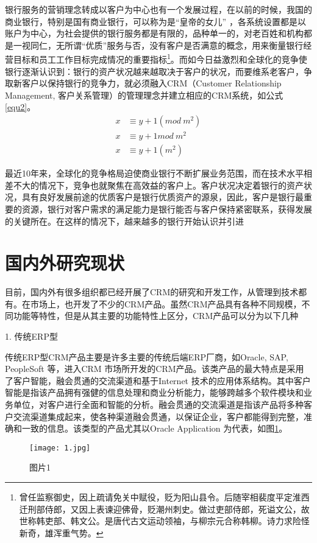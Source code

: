 银行服务的营销理念转成以客户为中心也有一个发展过程，在以前的时候，我国的商业银行，特别是国有商业银行，可以称为是“皇帝的女儿” ，各系统设置都是以账户为中心，为社会提供的银行服务都是有限的，品种单一的，对老百姓和机构都是一视同仁，无所谓“优质”服务与否，没有客户是否满意的概念，用来衡量银行经营目标和员工工作目标完成情况的重要指标\footnote{曾任监察御史，因上疏请免关中赋役，贬为阳山县令。后随宰相裴度平定淮西迁刑部侍郎，又因上表谏迎佛骨，贬潮州刺史。做过吏部侍郎，死谥文公，故世称韩吏部、韩文公。是唐代古文运动领袖，与柳宗元合称韩柳。诗力求险怪新奇，雄浑重气势。}。而如今日益激烈和全球化的竞争使银行逐渐认识到：银行的资产状况越来越取决于客户的状况，而要维系老客户，争取新客户以保持银行的竞争力，就必须融入CRM（Customer Relationship Management, 客户关系管理）的管理理念并建立相应的CRM系统，如公式\ref{equ2}。
\begin{align}\label{equ2}
  x&\equiv y+1(mod ~m^{2}) \\
  x&\equiv y+1mod ~m^{2} \nonumber \\
  x&\equiv y+1(m^{2}) \nonumber
\end{align}

最近10年来，全球化的竞争格局迫使商业银行不断扩展业务范围，而在技术水平相差不大的情况下，竞争也就聚焦在高效益的客户上。客户状况决定着银行的资产状况，具有良好发展前途的优质客户是银行优质资产的源泉，因此，客户是银行最重要的资源，银行对客户需求的满足能力是银行能否与客户保持紧密联系，获得发展的关键所在。在这样的情况下，越来越多的银行开始认识并引进

\section{国内外研究现状}
目前，国内外有很多组织都已经开展了CRM的研究和开发工作，从管理到技术都有。在市场上，也开发了不少的CRM产品。虽然CRM产品具有各种不同规模，不同功能等特性，但是从其主要的功能特性上区分，CRM产品可以分为以下几种

1.	传统ERP型

传统ERP型CRM产品主要是许多主要的传统后端ERP厂商，如Oracle, SAP, PeopleSoft 等，进入CRM 市场所开发的CRM产品。该类产品的最大特点是采用了客户智能，融会贯通的交流渠道和基于Internet 技术的应用体系结构。其中客户智能是指该产品拥有强健的信息处理和商业分析能力，能够跨越多个软件模块和业务单位，对客户进行全面和智能的分析。融会贯通的交流渠道是指该产品将多种客户交流渠道集成起来，使各种渠道融会贯通，以保证企业，客户都能得到完整，准确和一致的信息。该类型的产品尤其以Oracle Application 为代表，如图\ref{f1}。
\begin{figure}[htb]
  \centering
  \texttt{[image: 1.jpg]}\\
  \caption{图片1}\label{f1}
\end{figure}


